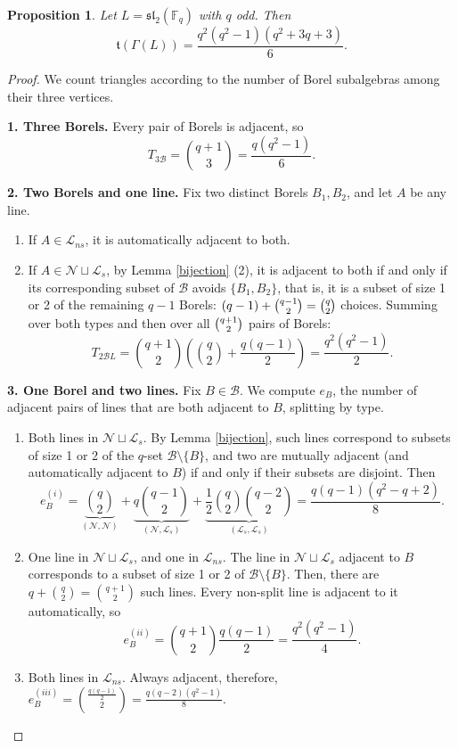 \documentclass[11pt]{amsart}
\theoremstyle{plain}
\newtheorem{proposition}[theorem]{Proposition}
\def\F{\mathbb{F}}
\begin{document}
\begin{proposition}\label{CaseD}
Let $L=\mathfrak{sl}_2(\F_q)$ with $q$ odd.  Then
\[\mathfrak{t}(\Gamma(L)) = \frac{q^2(q^2-1)(q^2+3q+3)}{6}.\]
\end{proposition}

\begin{proof}
We count triangles according to the number of Borel subalgebras
among their three vertices.

\smallskip
\noindent\textbf{1. Three Borels.} Every pair of Borels is adjacent, so
\[  T_{3\mathcal{B}} =\binom{q+1}{3}=\frac{q(q^2-1)}{6}.\]

\noindent\textbf{2. Two Borels and one line.} Fix two distinct Borels $B_1,B_2$, and let $A$ be any line.  
\begin{enumerate}
\item[(i)] If $A\in \mathcal{L}_{ns}$, it is automatically adjacent to both. 

\item[(ii)] If $A\in \mathcal{N}\sqcup \mathcal{L}_s$, by Lemma \ref{bijection} (2), it is adjacent to both if and only if its corresponding subset of $\mathcal{B}$ avoids $\{B_1, B_2\}$, that is, it is a subset of size 1 or 2 of the remaining $q-1$ Borels: $(q-1)+ \tbinom{q-1}{2} =\tbinom{q}{2}$ choices.
Summing over both types and then over all $\tbinom{q+1}{2}$ pairs of
Borels:
\[T_{2\mathcal{B}L} = \binom{q+1}{2} \left(\binom{q}{2}+ \frac{q(q-1)}{2}\right) =\frac{q^2(q^2-1)}{2}.\]
\end{enumerate}

\noindent\textbf{3. One Borel and two lines.}
Fix $B\in\mathcal{B}$.  We compute $e_{B}$, the number of adjacent pairs of lines that are both adjacent to $B$, splitting by type.
\begin{enumerate}
\item[(i)] Both lines in $\mathcal{N}\sqcup \mathcal{L}_s$. By Lemma \ref{bijection}, such lines correspond to subsets of size 1 or 2 of the $q$-set $\mathcal{B}\setminus\{B\}$, and two are mutually adjacent (and automatically adjacent to $B$) if and only if their subsets are disjoint. Then 
\[e_B^{(i)}=\underbrace{\binom{q}{2}}_{(\mathcal{N},\mathcal{N})} + \underbrace{q\binom{q-1}{2}}_{(\mathcal{N},\mathcal{L}_s)} +\underbrace{\frac{1}{2}\binom{q}{2}\binom{q-2}{2}}_{(\mathcal{L}_s, \mathcal{L}_s)}  =\frac{q(q-1)(q^2-q+2)}{8}.\]

\item[(ii)] One line in $\mathcal{N}\sqcup \mathcal{L}_s$, and one in $\mathcal{L}_{ns}$. The line in $\mathcal{N}\sqcup \mathcal{L}_s$ adjacent to $B$ corresponds to a subset of size 1 or 2 of $\mathcal{B}\setminus\{B\}$. Then, there are $q + \binom{q}{2} = \binom{q+1}{2}$ such lines. Every non-split line is adjacent to it automatically, so
\[e_B^{(ii)} = \binom{q+1}{2} \frac{q(q-1)}{2} =\frac{q^2(q^2-1)}{4}.\]
\item[(iii)] Both lines in $\mathcal{L}_{ns}$. Always adjacent, therefore, $e_B^{(iii)} =\binom{\frac{q(q-1)}{2}}{2} = \frac{q(q-2)(q^2-1)}{8}$.
\end{enumerate}


\end{proof}
\end{document}
